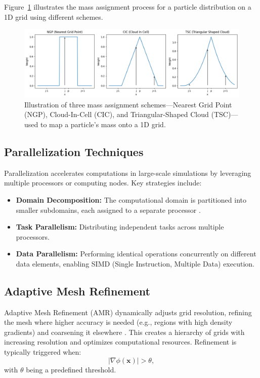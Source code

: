 Figure~\ref{fig:mass-assignment} illustrates the mass assignment process for a particle distribution on a 1D grid using different schemes.
\begin{figure}[ht]
    \centering
    \includegraphics[width=\textwidth]{figures/weight_functions.png}
    \caption[Illustration of three mass assignment schemes]{Illustration of three mass assignment schemes—Nearest Grid Point (NGP), Cloud-In-Cell (CIC), and Triangular-Shaped Cloud (TSC)—used to map a particle's mass onto a 1D grid.}
    \label{fig:mass-assignment}
\end{figure}

\subsection{Parallelization Techniques}
Parallelization accelerates computations in large-scale simulations by leveraging multiple processors or computing nodes. Key strategies include:
\begin{itemize}
    \item \textbf{Domain Decomposition:} The computational domain is partitioned into smaller subdomains, each assigned to a separate processor \citep{1986Natur.324..446B}.
    \item \textbf{Task Parallelism:} Distributing independent tasks across multiple processors.
    \item \textbf{Data Parallelism:} Performing identical operations concurrently on different data elements, enabling SIMD (Single Instruction, Multiple Data) execution.
\end{itemize}

\subsection{Adaptive Mesh Refinement}
Adaptive Mesh Refinement (AMR) dynamically adjusts grid resolution, refining the mesh where higher accuracy is needed (e.g., regions with high density gradients) and coarsening it elsewhere \citep{1989JCoPh..82...64B}. This creates a hierarchy of grids with increasing resolution and optimizes computational resources. Refinement is typically triggered when: 
\begin{equation}
    \left| \nabla \phi(\mathbf{x}) \right| > \theta,
\end{equation}
with $\theta$ being a predefined threshold.

